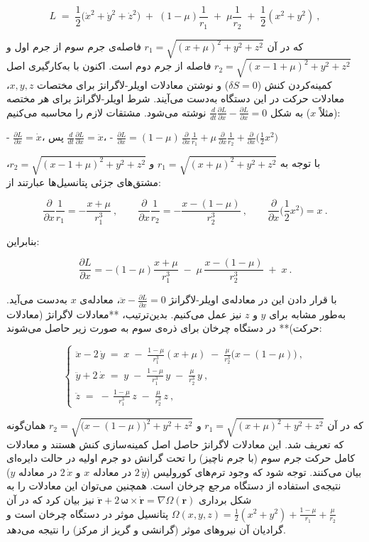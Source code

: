 $$
L \;=\; \frac{1}{2}\Big(\dot{x}^2+\dot{y}^2+\dot{z}^2\Big)\;+\;(1-\mu)\frac{1}{r_1}\;+\;\mu\frac{1}{r_2}\;+\;\frac{1}{2}(x^2+y^2)~,
$$

که در آن $r_1=\sqrt{(x+\mu)^2+y^2+z^2}$ فاصله‌ی جرم سوم از جرم اول و $r_2=\sqrt{(x-1+\mu)^2+y^2+z^2}$ فاصله از جرم دوم است. اکنون با به‌کارگیری اصل کمینه‌کردن کنش ($\delta S=0$) و نوشتن معادلات اویلر-لاگرانژ برای مختصات $x, y, z$، معادلات حرکت در این دستگاه به‌دست می‌آیند. شرط اویلر-لاگرانژ برای هر مختصه (مثلاً $x$) به شکل $\frac{d}{dt}\frac{\partial L}{\partial \dot{x}} - \frac{\partial L}{\partial x}=0$ نوشته می‌شود. مشتقات لازم را محاسبه می‌کنیم:

- $\displaystyle \frac{\partial L}{\partial \dot{x}} = \dot{x}$، پس $\frac{d}{dt}\frac{\partial L}{\partial \dot{x}} = \ddot{x}$،  
- $\displaystyle \frac{\partial L}{\partial x} = (1-\mu)\,\frac{\partial}{\partial x}\frac{1}{r_1} + \mu\,\frac{\partial}{\partial x}\frac{1}{r_2} + \frac{\partial}{\partial x}\Big(\frac{1}{2}x^2\Big)$ 

با توجه به $r_1=\sqrt{(x+\mu)^2+y^2+z^2}$ و $r_2=\sqrt{(x-1+\mu)^2+y^2+z^2}$، مشتق‌های جزئی پتانسیل‌ها عبارتند از:

$$ 
\frac{\partial}{\partial x}\frac{1}{r_1} = -\frac{x+\mu}{r_1^3}~, \qquad 
\frac{\partial}{\partial x}\frac{1}{r_2} = -\frac{x-(1-\mu)}{r_2^3}~, \qquad 
\frac{\partial}{\partial x}\Big(\frac{1}{2}x^2\Big) = x~. 
$$

بنابراین:

$$ 
\frac{\partial L}{\partial x} = -(1-\mu)\frac{x+\mu}{r_1^3} \;-\; \mu\,\frac{x-(1-\mu)}{r_2^3} \;+\; x~. 
$$

با قرار دادن این در معادله‌ی اویلر-لاگرانژ $\ddot{x} - \frac{\partial L}{\partial x}=0$، معادله‌ی $x$ به‌دست می‌آید. به‌طور مشابه برای $y$ و $z$ نیز عمل می‌کنیم. بدین‌ترتیب، **معادلات لاگرانژ (معادلات حرکت)** در دستگاه چرخان برای ذره‌ی سوم به صورت زیر حاصل می‌شوند:

$$ 
\begin{cases}
	\displaystyle \ddot{x} - 2\,\dot{y} \;=\; x \;-\; \frac{1-\mu}{r_1^3}(x+\mu) \;-\; \frac{\mu}{r_2^3}\Big(x-(1-\mu)\Big)~,  \\[2ex]
	\displaystyle \ddot{y} + 2\,\dot{x} \;=\; y \;-\; \frac{1-\mu}{r_1^3}\,y \;-\; \frac{\mu}{r_2^3}\,y~,  \\[2ex]
	\displaystyle \ddot{z} \;=\; -\,\frac{1-\mu}{r_1^3}\,z \;-\; \frac{\mu}{r_2^3}\,z~, 
\end{cases}
$$

که در آن $r_1=\sqrt{(x+\mu)^2+y^2+z^2}$ و $r_2=\sqrt{\big(x-(1-\mu)\big)^2+y^2+z^2}$ همان‌گونه که تعریف شد. این معادلات لاگرانژ حاصل اصل کمینه‌سازی کنش هستند و معادلات کامل حرکت جرم سوم (با جرم ناچیز) را تحت گرانش دو جرم اولیه در حالت دایره‌ای بیان می‌کنند. توجه شود که وجود ترم‌های کورولیس ($2\,\dot{y}$ در معادله $x$ و $2\,\dot{x}$ در معادله $y$) نتیجه‌ی استفاده از دستگاه مرجع چرخان است. همچنین می‌توان این معادلات را به شکل برداری $ \ddot{\mathbf{r}} + 2\,\mathbf{\omega}\times \dot{\mathbf{r}} = \nabla \Omega(\mathbf{r})$ نیز بیان کرد که در آن $\Omega(x,y,z) = \frac{1}{2}(x^2+y^2) + \frac{1-\mu}{r_1} + \frac{\mu}{r_2}$ پتانسیل موثر در دستگاه چرخان است و گرادیان آن نیروهای موثر (گرانشی و گریز از مرکز) را نتیجه می‌دهد.


